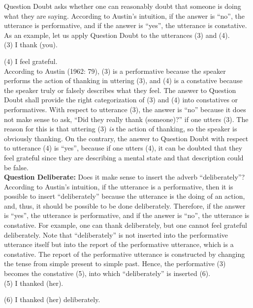 \documentclass[egregdoesnotlikesansseriftitles,12pt]{scrartcl}
\begin{document}
\noindent Question Doubt asks whether one can reasonably doubt that someone is doing what they are saying. According to Austin's intuition, if the answer is ``no'', the utterance is performative, and if the answer is ``yes'', the utterance is constative. As an example, let us apply Question Doubt to the utterances (3) and (4).\\

(3) I thank (you).\par
(4) I feel grateful.\\

\noindent According to Austin (1962: 79), (3) is a performative because the speaker performs the action of thanking in uttering (3), and (4) is a constative because the speaker truly or falsely describes what they feel. The answer to Question Doubt shall provide the right categorization of (3) and (4) into constatives or performatives. With respect to utterance (3), the answer is ``no'' because it does not make sense to ask, ``Did they really thank (someone)?'' if one utters (3). The reason for this is that uttering (3) \textit{is} the action of thanking, so the speaker is obviously thanking. On the contrary, the answer to Question Doubt with respect to utterance (4) is ``yes'', because if one utters (4), it can be doubted that they feel grateful since they are describing a mental state and that description could be false.\\

\textbf{Question Deliberate:} Does it make sense to insert the adverb ``deliberately''?\\

\noindent According to Austin's intuition, if the utterance is a performative, then it is possible to insert ``deliberately'' because the utterance is the doing of an action, and, thus, it should be possible to be done deliberately. Therefore, if the answer is ``yes'', the utterance is performative, and if the answer is ``no'', the utterance is constative. For example, one can thank deliberately, but one cannot feel grateful deliberately. Note that ``deliberately'' is not inserted into the performative utterance itself but into the report of the performative utterance, which is a constative. The report of the performative utterance is constructed by changing the tense from simple present to simple past. Hence, the performative (3) becomes the constative (5), into which ``deliberately'' is inserted (6).\\

(5) I thanked (her).\par
(6) I thanked (her) deliberately.\\
\end{document}
